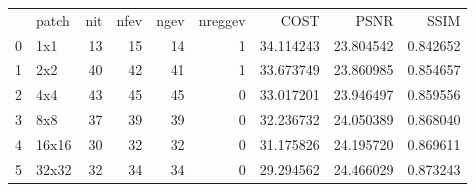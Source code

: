 \begin{tabular}{llrrrrrrr}
 & patch & nit & nfev & ngev & nreggev & COST & PSNR & SSIM \\
0 & 1x1 & 13 & 15 & 14 & 1 & 34.114243 & 23.804542 & 0.842652 \\
1 & 2x2 & 40 & 42 & 41 & 1 & 33.673749 & 23.860985 & 0.854657 \\
2 & 4x4 & 43 & 45 & 45 & 0 & 33.017201 & 23.946497 & 0.859556 \\
3 & 8x8 & 37 & 39 & 39 & 0 & 32.236732 & 24.050389 & 0.868040 \\
4 & 16x16 & 30 & 32 & 32 & 0 & 31.175826 & 24.195720 & 0.869611 \\
5 & 32x32 & 32 & 34 & 34 & 0 & 29.294562 & 24.466029 & 0.873243 \\
\end{tabular}

